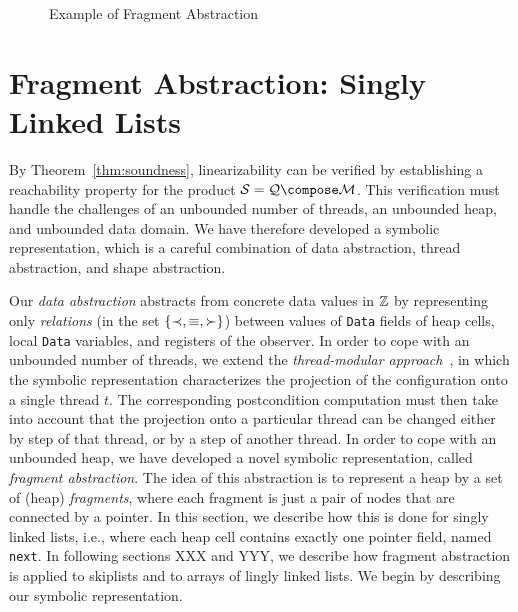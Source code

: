 \begin{center}
\begin{figure}

\caption{Example of Fragment Abstraction}
\label{lazylist}
\end{figure}
\end{center}
\section{Fragment Abstraction: Singly Linked Lists}
\label{sec:annotations}
By Theorem~\ref{thm:soundness}, linearizability can be verified by
establishing a 
reachability property for the product $\system=\augprog\compose\monitor$.
This verification must handle the challenges of
an unbounded number of threads, an unbounded heap, and unbounded data domain.
We have therefore developed a symbolic representation, which
is a careful combination of
data abstraction, thread abstraction, and shape abstraction. 

Our {\em data abstraction} abstracts from concrete data values in
${\mathbb Z}$ by representing only {\em relations}
(in the set $\left\{\prec,\equiv,\succ\right\}$) between values of {\tt Data} fields of 
heap cells, local {\tt Data} variables, and registers of the observer.
In order to cope with an unbounded number of threads,
we extend the {\em thread-modular approach}~\cite{BLMRS:cav08}, in which
the symbolic representation characterizes
the projection of the configuration onto a single thread $t$.
The corresponding postcondition computation must then take into account that
the projection onto a particular thread can be changed either by step of that
thread, or by a step of another thread.
In order to cope with an unbounded heap, we have developed a novel symbolic
representation, called {\em fragment abstraction}.
The idea of this abstraction is
to represent a heap by a set of (heap) {\em fragments}, where each fragment is
just a pair of nodes that are connected by a pointer.
In this section, we describe how this is done
for singly linked lists, i.e., where each heap cell contains exactly one
pointer field, named {\tt next}. In following sections XXX and YYY, we describe
how fragment abstraction is applied to skiplists and to arrays of lingly linked
lists. We begin by describing our symbolic representation.

